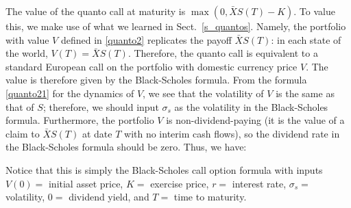 The value of the quanto call at maturity is
$\max(0, \bar{X}S(T)-K)$.
To value this, we make use of what we learned in Sect.~\ref{s_quantos}.  Namely, the portfolio with value $V$ defined in \eqref{quanto2} replicates the payoff $\bar{X}S(T)$:  in each state of the world, $V(T) = \bar{X}S(T)$.  Therefore, the quanto call is equivalent to a standard European call on the portfolio with domestic currency price $V$.  The value is therefore given by the Black-Scholes formula.  From the formula \eqref{quanto21} for the dynamics of $V$, we see that the volatility of $V$ is the same as that of $S$; therefore, we should input $\sigma_s$ as the volatility in the Black-Scholes formula.  Furthermore, the portfolio $V$ is non-dividend-paying (it is the value of a claim to $\bar{X}S(T)$ at date $T$ with no interim cash flows), so the dividend rate in the Black-Scholes formula should be zero. Thus, we have:

Notice that this is simply the Black-Scholes call option formula with inputs $V(0)=$ initial asset price, $K=$ exercise price, $r=$ interest rate, $\sigma_s=$ volatility, $0=$ dividend yield, and $T=$ time to maturity.

